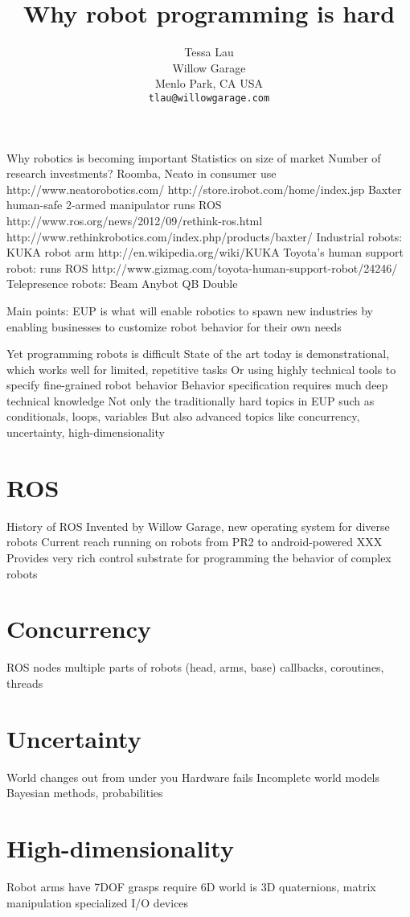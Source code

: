 \documentclass{article}
\begin{document}
\title {Why robot programming is hard}
\author {Tessa Lau \\
Willow Garage \\
Menlo Park, CA USA \\
{\tt tlau@willowgarage.com}
}
\maketitle

Why robotics is becoming important
Statistics on size of market
Number of research investments?
Roomba, Neato in consumer use
	http://www.neatorobotics.com/
	http://store.irobot.com/home/index.jsp
Baxter human-safe 2-armed manipulator
	runs ROS
	http://www.ros.org/news/2012/09/rethink-ros.html
	http://www.rethinkrobotics.com/index.php/products/baxter/
Industrial robots:
	KUKA robot arm http://en.wikipedia.org/wiki/KUKA
Toyota's human support robot:
	runs ROS
	http://www.gizmag.com/toyota-human-support-robot/24246/
Telepresence robots:
	Beam
	Anybot QB
	Double

Main points:
	EUP is what will enable robotics to spawn new industries
	by enabling businesses to customize robot behavior for their own needs

	Yet programming robots is difficult
	State of the art today is demonstrational, which works well for limited, repetitive tasks
	Or using highly technical tools to specify fine-grained robot behavior
	Behavior specification requires much deep technical knowledge
	Not only the traditionally hard topics in EUP such as conditionals, loops, variables
	But also advanced topics like concurrency, uncertainty, high-dimensionality

\section{ROS}

History of ROS
Invented by Willow Garage, new operating system for diverse robots
Current reach
running on robots from PR2 to android-powered XXX
Provides very rich control substrate for programming the behavior of complex robots

\section{Concurrency}

ROS nodes
multiple parts of robots (head, arms, base)
callbacks, coroutines, threads

\section{Uncertainty}

World changes out from under you
Hardware fails
Incomplete world models
Bayesian methods, probabilities

\section{High-dimensionality}

Robot arms have 7DOF
grasps require 6D
world is 3D
quaternions, matrix manipulation
specialized I/O devices



\end{document}
